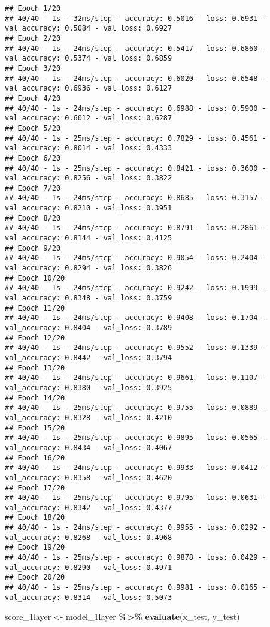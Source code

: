 \documentclass[
]{article}
\newenvironment{Shaded}{\begin{snugshade}}{\end{snugshade}}
\newcommand{\FunctionTok}[1]{\textcolor[rgb]{0.13,0.29,0.53}{\textbf{#1}}}
\newcommand{\NormalTok}[1]{#1}
\newcommand{\OtherTok}[1]{\textcolor[rgb]{0.56,0.35,0.01}{#1}}
\newcommand{\SpecialCharTok}[1]{\textcolor[rgb]{0.81,0.36,0.00}{\textbf{#1}}}
\begin{document}
\begin{verbatim}
## Epoch 1/20
## 40/40 - 1s - 32ms/step - accuracy: 0.5016 - loss: 0.6931 - val_accuracy: 0.5084 - val_loss: 0.6927
## Epoch 2/20
## 40/40 - 1s - 24ms/step - accuracy: 0.5417 - loss: 0.6860 - val_accuracy: 0.5374 - val_loss: 0.6859
## Epoch 3/20
## 40/40 - 1s - 24ms/step - accuracy: 0.6020 - loss: 0.6548 - val_accuracy: 0.6936 - val_loss: 0.6127
## Epoch 4/20
## 40/40 - 1s - 24ms/step - accuracy: 0.6988 - loss: 0.5900 - val_accuracy: 0.6012 - val_loss: 0.6287
## Epoch 5/20
## 40/40 - 1s - 25ms/step - accuracy: 0.7829 - loss: 0.4561 - val_accuracy: 0.8014 - val_loss: 0.4333
## Epoch 6/20
## 40/40 - 1s - 25ms/step - accuracy: 0.8421 - loss: 0.3600 - val_accuracy: 0.8256 - val_loss: 0.3822
## Epoch 7/20
## 40/40 - 1s - 24ms/step - accuracy: 0.8685 - loss: 0.3157 - val_accuracy: 0.8210 - val_loss: 0.3951
## Epoch 8/20
## 40/40 - 1s - 24ms/step - accuracy: 0.8791 - loss: 0.2861 - val_accuracy: 0.8144 - val_loss: 0.4125
## Epoch 9/20
## 40/40 - 1s - 24ms/step - accuracy: 0.9054 - loss: 0.2404 - val_accuracy: 0.8294 - val_loss: 0.3826
## Epoch 10/20
## 40/40 - 1s - 24ms/step - accuracy: 0.9242 - loss: 0.1999 - val_accuracy: 0.8348 - val_loss: 0.3759
## Epoch 11/20
## 40/40 - 1s - 24ms/step - accuracy: 0.9408 - loss: 0.1704 - val_accuracy: 0.8404 - val_loss: 0.3789
## Epoch 12/20
## 40/40 - 1s - 24ms/step - accuracy: 0.9552 - loss: 0.1339 - val_accuracy: 0.8442 - val_loss: 0.3794
## Epoch 13/20
## 40/40 - 1s - 24ms/step - accuracy: 0.9661 - loss: 0.1107 - val_accuracy: 0.8380 - val_loss: 0.3925
## Epoch 14/20
## 40/40 - 1s - 25ms/step - accuracy: 0.9755 - loss: 0.0889 - val_accuracy: 0.8328 - val_loss: 0.4210
## Epoch 15/20
## 40/40 - 1s - 25ms/step - accuracy: 0.9895 - loss: 0.0565 - val_accuracy: 0.8434 - val_loss: 0.4067
## Epoch 16/20
## 40/40 - 1s - 24ms/step - accuracy: 0.9933 - loss: 0.0412 - val_accuracy: 0.8358 - val_loss: 0.4620
## Epoch 17/20
## 40/40 - 1s - 25ms/step - accuracy: 0.9795 - loss: 0.0631 - val_accuracy: 0.8342 - val_loss: 0.4377
## Epoch 18/20
## 40/40 - 1s - 24ms/step - accuracy: 0.9955 - loss: 0.0292 - val_accuracy: 0.8268 - val_loss: 0.4968
## Epoch 19/20
## 40/40 - 1s - 25ms/step - accuracy: 0.9878 - loss: 0.0429 - val_accuracy: 0.8290 - val_loss: 0.4971
## Epoch 20/20
## 40/40 - 1s - 25ms/step - accuracy: 0.9981 - loss: 0.0165 - val_accuracy: 0.8314 - val_loss: 0.5073
\end{verbatim}

\begin{Shaded}
\begin{Highlighting}[]
\NormalTok{score\_1layer }\OtherTok{\textless{}{-}}\NormalTok{ model\_1layer }\SpecialCharTok{\%\textgreater{}\%} \FunctionTok{evaluate}\NormalTok{(x\_test, y\_test)}
\end{Highlighting}
\end{Shaded}
\end{document}

